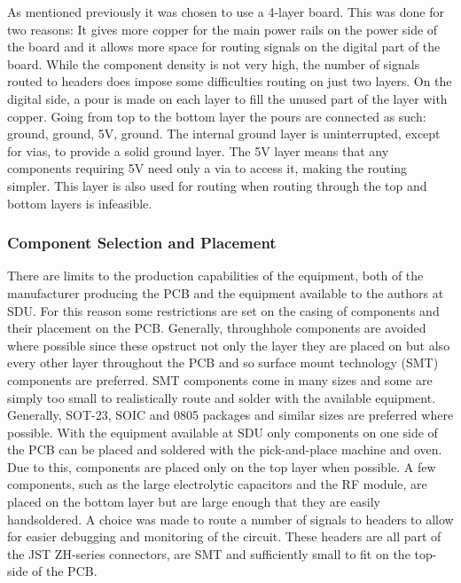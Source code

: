 As mentioned previously it was chosen to use a 4-layer board.
This was done for two reasons: It gives more copper for the main power rails on the power side of the board and it allows more space for routing signals on the digital part of the board.
While the component density is not very high, the number of signals routed to headers does impose some difficulties routing on just two layers.
On the digital side, a pour is made on each layer to fill the unused part of the layer with copper.
Going from top to the bottom layer the pours are connected as such: ground, ground, 5V, ground.
The internal ground layer is uninterrupted, except for vias, to provide a solid ground layer.
The 5V layer means that any components requiring 5V need only a via to access it, making the routing simpler.
This layer is also used for routing when routing through the top and bottom layers is infeasible.

\subsubsection{Component Selection and Placement} %
\label{ssub:component_case_selection_and_placement}
There are limits to the production capabilities of the equipment, both of the manufacturer producing the PCB and the equipment available to the authors at SDU.
For this reason some restrictions are set on the casing of components and their placement on the PCB.
Generally, throughhole components are avoided where possible since these opstruct not only the layer they are placed on but also every other layer throughout the PCB and so surface mount technology (SMT) components are preferred.
SMT components come in many sizes and some are simply too small to realistically route and solder with the available equipment.
Generally, SOT-23, SOIC and 0805 packages and similar sizes are preferred where possible.
With the equipment available at SDU only components on one side of the PCB can be placed and soldered with the pick-and-place machine and oven.
Due to this, components are placed only on the top layer when possible.
A few components, such as the large electrolytic capacitors and the RF module, are placed on the bottom layer but are large enough that they are easily handsoldered.
A choice was made to route a number of signals to headers to allow for easier debugging and monitoring of the circuit.
These headers are all part of the JST ZH-series connectors, are SMT and sufficiently small to fit on the top-side of the PCB.


